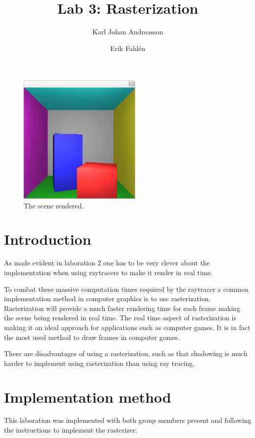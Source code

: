 \documentclass[a4paper]{article}
\begin{document}
\title{Lab 3: Rasterization}

\author{Karl Johan Andreasson \and Erik Fahlén}

\maketitle

\begin{figure}[H]
    \centering
    \includegraphics[width=6cm]{title.png}
    \caption{The scene rendered.}
    \label{fig:main}
\end{figure}

\section{Introduction}
As made evident in laboration 2 one has to be very clever about the
implementation when using raytracers to make it render in real time.

To combat these massive computation times required by the raytracer a common
implementation method in computer graphics is to use rasterization.
Rasterization will provide a much faster rendering time for each frame making
the scene being rendered in real time. The real time aspect of rasterization is
making it an ideal approach for applications such as computer games. It is in
fact the most used method to draw frames in computer games.

There are disadvantages of using a rasterization, such as that shadowing is much
harder to implement using rasterization than using ray tracing.

\section{Implementation method}

This laboration was implemented with both group members present and following
the instructions to implement the rasterizer.
\end{document}
